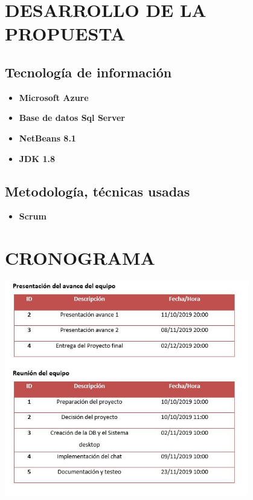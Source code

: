 \documentclass[12pt,letterpaper]{article}
\begin{document}
\section{DESARROLLO DE LA PROPUESTA}
	\subsection{Tecnología de información}
	\begin{itemize}
	\item \textbf{Microsoft Azure} \\ 
	\item \textbf{Base de datos Sql Server} \\ 
\item \textbf{NetBeans 8.1} \\ 
\item \textbf{JDK 1.8} \\ 


\end{itemize}
	\subsection{Metodología, técnicas usadas}
 \begin{itemize}
	\item \textbf{Scrum} \\ 

\end{itemize}
\section{CRONOGRAMA}

\begin{center}
\includegraphics[width=0.8\textwidth]{./Imagenes/cronograma}

\end{center}

\cite{1}


\end{document}
